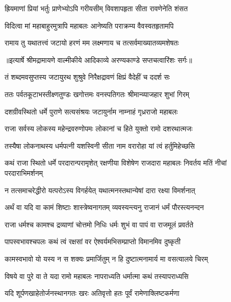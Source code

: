 \twolineshloka
{ह्रियमाणां प्रियां भर्तुः प्राणेभ्योऽपि गरीयसीम्}
{विवशापहृता सीता रावणेनेति शंसत} %

\twolineshloka
{विदित्वा मां महाबाहुरमुत्रापि महाबलः}
{आनेष्यति पराक्रम्य वैवस्वतहृतामपि} %

\twolineshloka
{रामाय तु यथातत्त्वं जटायो हरणं मम}
{लक्ष्मणाय च तत्सर्वमाख्यातव्यमशेषतः} %


{॥इत्यार्षे श्रीमद्रामायणे वाल्मीकीये आदिकाव्ये अरण्यकाण्डे सप्तचत्वारिंशः सर्गः॥}


\twolineshloka
{तं शब्दमवसुप्तस्य जटायुरथ शुश्रुवे}
{निरैक्षद्रावणं क्षिप्रं वैदेहीं च ददर्श सः} %

\twolineshloka
{ततः पर्वतकूटाभस्तीक्ष्णतुण्डः खगोत्तमः}
{वनस्पतिगतः श्रीमान्व्याजहार शुभां गिरम्} %

\twolineshloka
{दशग्रीवस्थितो धर्मे पुराणे सत्यसंश्रयः}
{जटायुर्नाम नाम्नाहं गृध्रराजो महाबलः} %

\twolineshloka
{राजा सर्वस्य लोकस्य महेन्द्रवरुणोपमः}
{लोकानां च हिते युक्तो रामो दशरथात्मजः} %

\twolineshloka
{तस्यैषा लोकनाथस्य धर्मपत्नी यशस्विनी}
{सीता नाम वरारोहा यां त्वं हर्तुमिहेच्छसि} %

\threelineshloka
{कथं राजा स्थितो धर्मे परदारान्परामृशेत्}
{रक्षणीया विशेषेण राजदारा महाबलः}
{निवर्तय मतिं नीचां परदाराभिमर्शनम्} %

\twolineshloka
{न तत्समाचरेद्धीरो यत्परोऽस्य विगर्हयेत्}
{यथात्मनस्तथान्येषां दारा रक्ष्या विमर्शनात्} %

\twolineshloka
{अर्थं वा यदि वा कामं शिष्टाः शास्त्रेष्वनागतम्}
{व्यवस्यन्त्यनु राजानं धर्मं पौरस्त्यनन्दन} %

\twolineshloka
{राजा धर्मश्च कामश्च द्रव्याणां चोत्तमो निधिः}
{धर्मः शुभं वा पापं वा राजमूलं प्रवर्तते} %

\twolineshloka
{पापस्वभावश्चपलः कथं त्वं रक्षसां वर}
{ऐश्वर्यमभिसम्प्राप्तो विमानमिव दुष्कृती} %

\twolineshloka
{कामस्वभावो यो यस्य न स शक्यः प्रमार्जितुम्}
{न हि दुष्टात्मनामार्य मा वसत्यालये चिरम्} %

\twolineshloka
{विषये वा पुरे वा ते यदा रामो महाबलः}
{नापराध्यति धर्मात्मा कथं तस्यापराध्यसि} %

\twolineshloka
{यदि शूर्पणखाहेतोर्जनस्थानगतः खरः}
{अतिवृत्तो हतः पूर्वं रामेणाक्लिष्टकर्मणा} %

